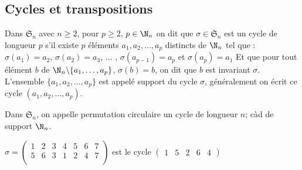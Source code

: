 \subsection{Cycles et transpositions}
\begin{defini}[Cycle]
Dans $\mathfrak{S}_n$ avec $n\geq 2$, pour $p\geq 2$, $p\in\N_n$ on dit que $\sigma\in\mathfrak{S}_n$ est un cycle de longueur $p$ s'il existe $p$ éléments $a_1,a_2,\dots,a_p$ distincts de $\N_n$ tel que :
$\sigma(a_1)=a_2$, $\sigma(a_2)=a_3$, $\dots$ , $\sigma(a_{p-1})=a_p$ et $\sigma(a_p)=a_1$
Et que pour tout élément $b$ de $\N_n\backslash\{a_1,\dots,a_p\}$, $\sigma(b)=b$, on dit que $b$ est invariant $\sigma$.
L'ensemble $\{a_1,a_2,\dots,a_p\}$ est appelé support du cycle $\sigma$, généralement on écrit ce cycle $(a_1,a_2,\dots,a_p)$.

Dans $\mathfrak{S}_n$, on appelle permutation circulaire un cycle de longueur $n$; càd de support $\N_n$.
\end{defini}

\begin{ex}
$\sigma=\begin{pmatrix}
1 &2 &3 &4 &5 &6 &7\\
5 &6 & 3 & 1 & 2& 4 & 7\\
\end{pmatrix}$ est le cycle $\begin{pmatrix}
1&5&2&6&4
\end{pmatrix}$
\end{ex}

